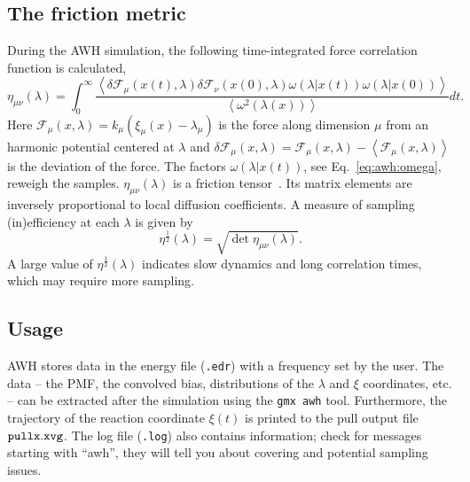 \subsection{The friction metric}\label{sec:awh:friction}
During the AWH simulation, the following time-integrated force correlation function is calculated,
\newcommand{\av}[1]{\left<{#1}\right>}
\begin{equation} \label{eq:awh:metric}
\eta_{\mu\nu}(\lambda) =
\int_0^\infty
\frac{
\av{\delta \mathcal{F}_{\mu}(x(t),\lambda)
\delta \mathcal{F}_\nu(x(0),\lambda)
\omega(\lambda|x(t)) \omega(\lambda|x(0))}}
{\av{\omega^2(\lambda(x))}}
dt.
\end{equation}
Here $\mathcal F_\mu(x,\lambda) = k_\mu (\xi_\mu(x) - \lambda_\mu)$ 
is the force along dimension $\mu$ from an harmonic potential centered at $\lambda$
and $\delta \mathcal F_\mu(x,\lambda) = \mathcal F_\mu(x,\lambda) - \av{\mathcal F_\mu(x,\lambda)}$
is the deviation of the force.
The factors $\omega(\lambda|x(t))$, see Eq.~\ref{eq:awh:omega}, reweigh the samples.
$\eta_{\mu\nu}(\lambda)$ is a friction tensor~\cite{sivak2012thermodynamic}.
Its matrix elements are inversely proportional to local diffusion coefficients.
A measure of sampling (in)efficiency at each $\lambda$ is given by
\begin{equation}\label{eq:awh:sqrt-metric}
\eta^{\frac{1}{2}}(\lambda) = \sqrt{\det\eta_{\mu\nu}(\lambda)}.
\end{equation}
A large value of  $\eta^{\frac{1}{2}}(\lambda)$ indicates slow dynamics and long correlation times,
which may require more sampling.

\subsection{Usage}\label{sec:awh:usage}

AWH stores data in the energy file ({\tt .edr}) with a frequency set by the user.
The data -- the PMF, the convolved bias, distributions of the $\lambda$ and $\xi$ coordinates, etc. -- 
can be extracted after the simulation using the {\tt gmx awh} tool.
Furthermore, the trajectory of the reaction coordinate $\xi(t)$ is printed to the pull output file ${\tt pullx.xvg}$.
The log file ({\tt .log})  also contains information;
check for messages starting with ``awh'', they will tell you about covering and potential sampling issues.

